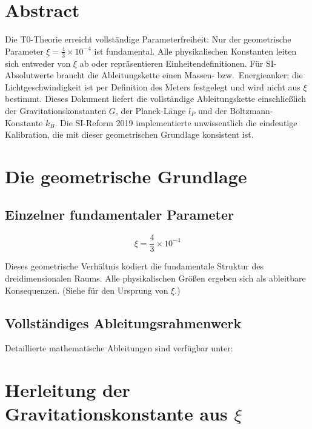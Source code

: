 \section*{Abstract}
		Die T0-Theorie erreicht vollständige Parameterfreiheit: Nur der geometrische Parameter $\xi = \frac{4}{3} \times 10^{-4}$ ist fundamental. Alle physikalischen Konstanten leiten sich entweder von $\xi$ ab oder repräsentieren Einheitendefinitionen. Für SI-Absolutwerte braucht die Ableitungskette einen Massen- bzw.\ Energieanker; die Lichtgeschwindigkeit ist per Definition des Meters festgelegt und wird nicht aus $\xi$ bestimmt. Dieses Dokument liefert die vollständige Ableitungskette einschließlich der Gravitationskonstanten $G$, der Planck-Länge $l_P$ und der Boltzmann-Konstante $k_B$. Die SI-Reform 2019 implementierte unwissentlich die eindeutige Kalibration, die mit dieser geometrischen Grundlage konsistent ist.

	
	
	
	
	\section{Die geometrische Grundlage}
	
	\subsection{Einzelner fundamentaler Parameter}
	
	\begin{equation}
		\boxed{\xi = \frac{4}{3} \times 10^{-4}}
	\end{equation}
	
	Dieses geometrische Verhältnis kodiert die fundamentale Struktur des dreidimensionalen Raums. Alle physikalischen Größen ergeben sich als ableitbare Konsequenzen. (Siehe \cite{T0_xi_ursprung_De} für den Ursprung von $\xi$.)
	
	\subsection{Vollständiges Ableitungsrahmenwerk}
	
	Detaillierte mathematische Ableitungen sind verfügbar unter:
	
	\begin{center}
		
	\end{center}
	
	\section{Herleitung der Gravitationskonstante aus $\xi$}
	
